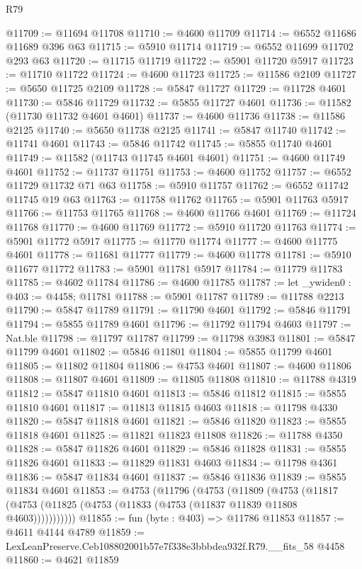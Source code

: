 \begin{lexlean}{R79}
\begin{coremodule}
@11709 := @11694 @11708
@11710 := @4600 @11709
@11714 := @6552 @11686 @11689 @396 @63
@11715 := @5910 @11714
@11719 := @6552 @11699 @11702 @293 @63
@11720 := @11715 @11719
@11722 := @5901 @11720 @5917
@11723 := @11710 @11722
@11724 := @4600 @11723
@11725 := @11586 @2109
@11727 := @5650 @11725 @2109
@11728 := @5847 @11727
@11729 := @11728 @4601
@11730 := @5846 @11729
@11732 := @5855 @11727 @4601
@11736 := @11582 (@11730 @11732 @4601 @4601)
@11737 := @4600 @11736
@11738 := @11586 @2125
@11740 := @5650 @11738 @2125
@11741 := @5847 @11740
@11742 := @11741 @4601
@11743 := @5846 @11742
@11745 := @5855 @11740 @4601
@11749 := @11582 (@11743 @11745 @4601 @4601)
@11751 := @4600 @11749 @4601
@11752 := @11737 @11751
@11753 := @4600 @11752
@11757 := @6552 @11729 @11732 @71 @63
@11758 := @5910 @11757
@11762 := @6552 @11742 @11745 @19 @63
@11763 := @11758 @11762
@11765 := @5901 @11763 @5917
@11766 := @11753 @11765
@11768 := @4600 @11766 @4601
@11769 := @11724 @11768
@11770 := @4600 @11769
@11772 := @5910 @11720 @11763
@11774 := @5901 @11772 @5917
@11775 := @11770 @11774
@11777 := @4600 @11775 @4601
@11778 := @11681 @11777
@11779 := @4600 @11778
@11781 := @5910 @11677 @11772
@11783 := @5901 @11781 @5917
@11784 := @11779 @11783
@11785 := @4602 @11784
@11786 := @4600 @11785
@11787 := let _ywiden0 : @403 := @4458; @11781
@11788 := @5901 @11787
@11789 := @11788 @2213
@11790 := @5847 @11789
@11791 := @11790 @4601
@11792 := @5846 @11791
@11794 := @5855 @11789 @4601
@11796 := @11792 @11794 @4603
@11797 := Nat.ble
@11798 := @11797 @11787
@11799 := @11798 @3983
@11801 := @5847 @11799 @4601
@11802 := @5846 @11801
@11804 := @5855 @11799 @4601
@11805 := @11802 @11804
@11806 := @4753 @4601
@11807 := @4600 @11806
@11808 := @11807 @4601
@11809 := @11805 @11808
@11810 := @11788 @4319
@11812 := @5847 @11810 @4601
@11813 := @5846 @11812
@11815 := @5855 @11810 @4601
@11817 := @11813 @11815 @4603
@11818 := @11798 @4330
@11820 := @5847 @11818 @4601
@11821 := @5846 @11820
@11823 := @5855 @11818 @4601
@11825 := @11821 @11823 @11808
@11826 := @11788 @4350
@11828 := @5847 @11826 @4601
@11829 := @5846 @11828
@11831 := @5855 @11826 @4601
@11833 := @11829 @11831 @4603
@11834 := @11798 @4361
@11836 := @5847 @11834 @4601
@11837 := @5846 @11836
@11839 := @5855 @11834 @4601
@11853 := @4753
    (@11796
      (@4753
        (@11809
          (@4753 (@11817 (@4753 (@11825 (@4753 (@11833 (@4753 (@11837 @11839 @11808 @4603)))))))))))
@11855 := fun (byte : @403) => @11786 @11853
@11857 := @4611 @4144 @4789
@11859 := LexLeanPreserve.Ceb108802001b57e7f338e3bbbdea932f.R79.__fits_58 @4458
@11860 := @4621 @11859

\end{coremodule}
\end{lexlean}
